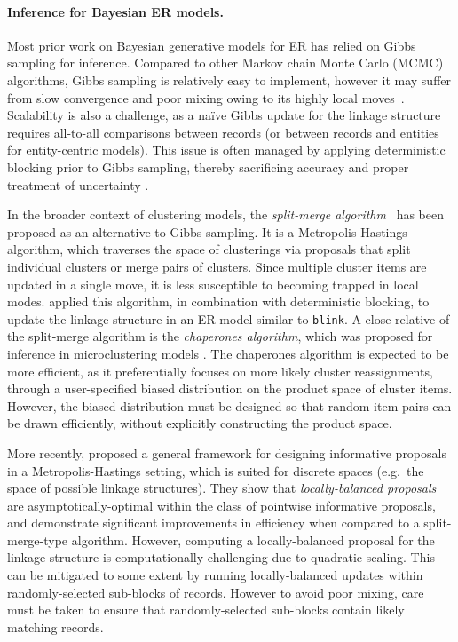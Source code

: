 \documentclass[12pt,letterpaper]{article}
\newcommand{\1}[1]{\mathbb{I}\!\left[#1\right]} %
\newcommand{\blink}{\texttt{\upshape \lowercase{blink}}} %
\begin{document}
\paragraph{Inference for Bayesian ER models.}
Most prior work on Bayesian generative models for ER
\citep[e.g.][]{tancredi_hierarchical_2011, gutman_bayesian_2013,
  steorts_entity_2015} has relied on Gibbs sampling for inference. 
Compared to other Markov chain Monte Carlo (MCMC) algorithms, 
Gibbs sampling is relatively easy to implement, however it may suffer 
from slow convergence and poor mixing owing to its highly local 
moves~\citep{liu_monte_2004}. 
Scalability is also a challenge, as a na\"{i}ve Gibbs update for the 
linkage structure requires all-to-all comparisons between records 
(or between records and entities for entity-centric models). 
This issue is often managed by applying deterministic blocking prior to 
Gibbs sampling, thereby sacrificing accuracy and proper 
treatment of uncertainty \citep{larsen_advances_2005, larsen_experiment_2012, 
tancredi_hierarchical_2011, gutman_bayesian_2013, sadinle_detecting_2014}.

In the broader context of clustering models, the \emph{split-merge 
algorithm}~\citep{jain_split-merge_2004} has been proposed 
as an alternative to Gibbs sampling.
It is a Metropolis-Hastings algorithm, which traverses the space of 
clusterings via proposals that split individual clusters or merge pairs 
of clusters. 
Since multiple cluster items are updated in a single move, it is less 
susceptible to becoming trapped in local modes.
\cite{steorts_bayesian_2016} applied this algorithm, in combination with 
deterministic blocking, to update the linkage structure in an ER model 
similar to \blink. 
A close relative of the split-merge algorithm is the \emph{chaperones 
  algorithm}, which was proposed for inference in microclustering models
\citep{zanella_flexible_2016}. 
The chaperones algorithm is expected to be more efficient, as it 
preferentially focuses on more likely cluster reassignments, 
through a user-specified biased distribution on the product space of 
cluster items. 
However, the biased distribution must be designed so that random 
item pairs can be drawn efficiently, without explicitly constructing 
the product space. 

More recently, \citet{zanella_informed_2020} proposed a general 
framework for designing informative proposals in a Metropolis-Hastings 
setting, which is suited for discrete spaces (e.g.\ the space of 
possible linkage structures). 
They show that \emph{locally-balanced proposals} are asymptotically-optimal 
within the class of pointwise informative proposals, and demonstrate 
significant improvements in efficiency when compared to a split-merge-type
algorithm.
However, computing a locally-balanced proposal for the linkage structure 
is computationally challenging due to quadratic scaling. 
This can be mitigated to some extent by running locally-balanced 
updates within randomly-selected sub-blocks of records. 
However to avoid poor mixing, care must be taken to ensure that  
randomly-selected sub-blocks contain likely matching records.
\end{document}
